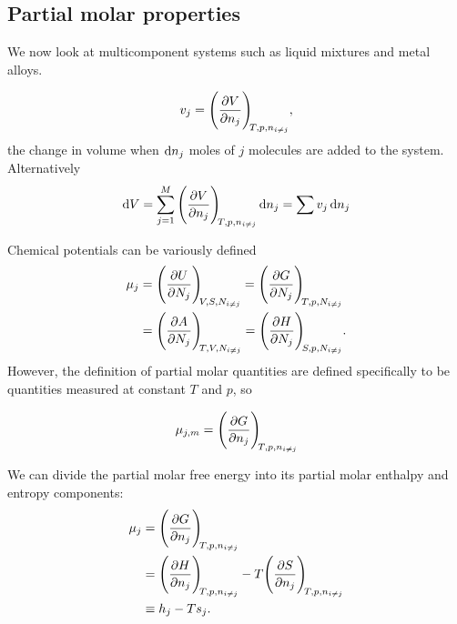 \subsection{Partial molar properties}
We now look at multicomponent systems such as liquid mixtures and metal alloys.
\begin{defi}
\begin{equation}
v_j=\diffp{V}{n_j}[T,p,n_{i\neq j}], 
\end{equation}
the change in volume when $\dif n_j$ moles of $j$ molecules are added to the system. Alternatively
\begin{equation}
\dif V=\sum_{j=1}^M \diffp{V}{n_j}[T,p,n_{i\neq j}]\dif n_j=\sum v_j\dif n_j
\end{equation}
\end{defi}
Chemical potentials can be variously defined
\begin{equation}
\begin{aligned}
\mu_j&=\diffp{U}{N_j}[V,S,N_{i\neq j}]=\diffp{G}{N_j}[T,p,N_{i\neq j}]\\
&=\diffp{A}{N_j}[T,V,N_{i\neq j}]=\diffp{H}{N_j}[S,p,N_{i\neq j}].
\end{aligned}
\end{equation}
However, the definition of partial molar quantities are defined specifically 
to be quantities measured at constant $T$ and $p$, so
\begin{defi}
\begin{equation}
\mu_{j,m}=\diffp{G}{n_j}[T,p,n_{i\neq j}]
\end{equation}
\end{defi}
We can divide the partial molar free energy into its partial molar enthalpy and entropy components: 
\begin{equation}
\begin{aligned}
\mu_j&=\diffp{G}{n_j}[T,p,n_{i\neq j}]\\
&=\diffp{H}{n_j}[T,p,n_{i\neq j}]-T\diffp{S}{n_j}[T,p,n_{i\neq j}]\\
&\equiv h_j-Ts_j.
\end{aligned}
\end{equation}